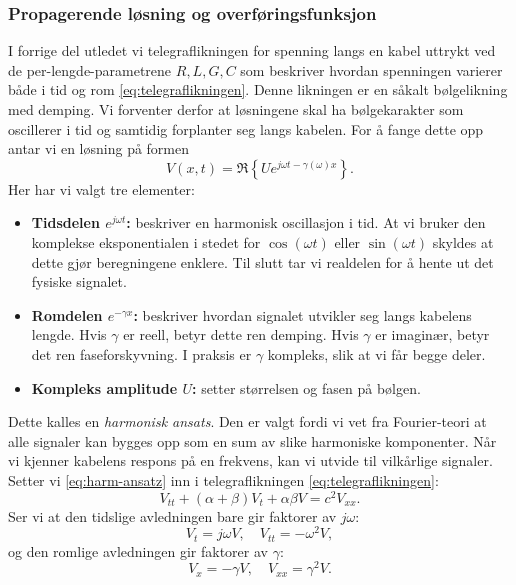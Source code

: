 \subsubsection{Propagerende løsning og overføringsfunksjon}

I forrige del utledet vi telegraflikningen for spenning langs en kabel uttrykt ved de per-lengde-parametrene $R, L, G, C$ som beskriver hvordan spenningen varierer både i tid og rom \eqref{eq:telegraflikningen}. Denne likningen er en såkalt bølgelikning med demping. Vi forventer derfor at løsningene skal ha bølgekarakter som oscillerer i tid og samtidig forplanter seg langs kabelen. For å fange dette opp antar vi en løsning på formen
\begin{equation}
V(x,t) = \Re\!\left\{ U e^{j\omega t - \gamma(\omega)x} \right\}.
\label{eq:harm-ansatz}
\end{equation}
Her har vi valgt tre elementer:
\begin{itemize}
    \item \textbf{Tidsdelen $e^{j\omega t}$:} beskriver en harmonisk oscillasjon i tid. At vi bruker den 
    komplekse eksponentialen i stedet for $\cos(\omega t)$ eller $\sin(\omega t)$ skyldes at dette 
    gjør beregningene enklere. Til slutt tar vi realdelen for å hente ut det fysiske signalet.\\
    \item \textbf{Romdelen $e^{-\gamma x}$:} beskriver hvordan signalet utvikler seg langs kabelens lengde. 
    Hvis $\gamma$ er reell, betyr dette ren demping. Hvis $\gamma$ er imaginær, betyr det ren faseforskyvning. 
    I praksis er $\gamma$ kompleks, slik at vi får begge deler.\\
    \item \textbf{Kompleks amplitude $U$:} setter størrelsen og fasen på bølgen.\\
\end{itemize}
Dette kalles en \emph{harmonisk ansats}. Den er valgt fordi vi vet fra Fourier-teori at alle signaler 
kan bygges opp som en sum av slike harmoniske komponenter. Når vi kjenner kabelens respons på en frekvens, 
kan vi utvide til vilkårlige signaler. Setter vi \eqref{eq:harm-ansatz} inn i telegraflikningen \eqref{eq:telegraflikningen}:
\[    
    V_{tt} + (\alpha + \beta)V_{t} + \alpha \beta V = c^2 V_{xx}.
\]
Ser vi at den tidslige avledningen bare gir faktorer av $j\omega$:
\[
    V_{t} = j\omega V, \quad V_{tt} = -\omega^2 V,
\]
og den romlige avledningen gir faktorer av $\gamma$:
\[
    V_{x} = -\gamma V, \quad V_{xx} = \gamma^2 V.
\]
